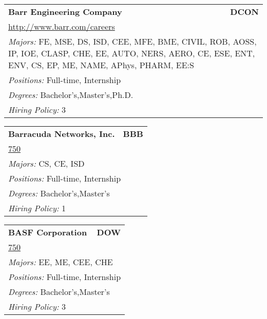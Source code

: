 \documentclass[twoside]{article}
\begin{document}
\begin{center}
\begin{multicols}{3}
\begin{FlushLeft}
\begin{minipage}{\columnwidth}\begin{tabularx}{.95\columnwidth}{Xr}
                 {\Large\bf Barr Engineering Company} & {\Large\bf DCON}\\
    \multicolumn{2}{p{.95\columnwidth}}{\url{http://www.barr.com/careers}}\\
    \multicolumn{2}{p{.95\columnwidth}}{\emph{Majors:} FE, MSE, DS, ISD, CEE, MFE, BME, CIVIL, ROB, AOSS, IP, IOE, CLASP, CHE, EE, AUTO, NERS, AERO, CE, ESE, ENT, ENV, CS, EP, ME, NAME, APhys, PHARM, EE:S}\\
    \multicolumn{2}{p{.95\columnwidth}}{\emph{Positions:} Full-time, Internship}\\
    \multicolumn{2}{p{.95\columnwidth}}{\emph{Degrees:} Bachelor's,Master's,Ph.D.}\\
    \multicolumn{2}{p{.95\columnwidth}}{\emph{Hiring Policy:} 3}\\
    \end{tabularx}
    
\end{minipage}
 
\begin{minipage}{\columnwidth}\begin{tabularx}{.95\columnwidth}{Xr}
                 {\Large\bf Barracuda Networks, Inc.} & {\Large\bf BBB}\\
    \multicolumn{2}{p{.95\columnwidth}}{\url{750}}\\
    \multicolumn{2}{p{.95\columnwidth}}{\emph{Majors:} CS, CE, ISD}\\
    \multicolumn{2}{p{.95\columnwidth}}{\emph{Positions:} Full-time, Internship}\\
    \multicolumn{2}{p{.95\columnwidth}}{\emph{Degrees:} Bachelor's,Master's}\\
    \multicolumn{2}{p{.95\columnwidth}}{\emph{Hiring Policy:} 1}\\
    \end{tabularx}
    
\end{minipage}
 
\begin{minipage}{\columnwidth}\begin{tabularx}{.95\columnwidth}{Xr}
                 {\Large\bf BASF Corporation} & {\Large\bf DOW}\\
    \multicolumn{2}{p{.95\columnwidth}}{\url{750}}\\
    \multicolumn{2}{p{.95\columnwidth}}{\emph{Majors:} EE, ME, CEE, CHE}\\
    \multicolumn{2}{p{.95\columnwidth}}{\emph{Positions:} Full-time, Internship}\\
    \multicolumn{2}{p{.95\columnwidth}}{\emph{Degrees:} Bachelor's,Master's}\\
    \multicolumn{2}{p{.95\columnwidth}}{\emph{Hiring Policy:} 3}\\
    \end{tabularx}
    

\end{minipage}
\end{FlushLeft}
\end{multicols}
\end{center}
\end{document}
